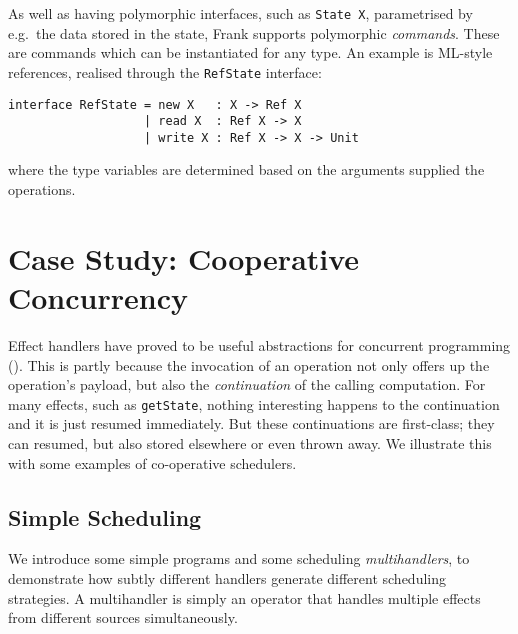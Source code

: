 \documentclass[msc,deptreport,cs]{infthesis} %
\newcommand{\code}[1]{\lstinline{#1}}
\newcommand{\todo}[1]
           {{\par\noindent\small\color{RoyalPurple}
  \framebox{\parbox{\dimexpr\linewidth-2\fboxsep-2\fboxrule}
    {\textbf{TODO:} #1}}}}
\begin{document}
As well as having polymorphic interfaces, such as \code{State X}, parametrised
by e.g.~the data stored in the state, Frank supports polymorphic
\emph{commands}. These are commands which can be instantiated for any type. An
example is ML-style references, realised through the \code{RefState} interface:

\begin{lstlisting}
interface RefState = new X   : X -> Ref X
                   | read X  : Ref X -> X
                   | write X : Ref X -> X -> Unit
\end{lstlisting}

\noindent where the type variables are determined based on the arguments supplied
the operations.

\section{Case Study: Cooperative Concurrency}
\label{sec:concurrency}


Effect handlers have proved to be useful abstractions for concurrent programming
(\cite{dolan2015effective, dolan2017concurrent, hillerstrom2016compilation}).
This is partly because the invocation of an operation not only offers up the
operation's payload, but also the \emph{continuation} of the calling
computation. For many effects, such as \code{getState}, nothing interesting
happens to the continuation and it is just resumed immediately. But these
continuations are first-class; they can resumed, but also stored elsewhere or
even thrown away. We illustrate this with some examples of co-operative schedulers.


%

\subsection{Simple Scheduling}
\label{subsec:simple-scheduling}

We introduce some simple programs and some scheduling \emph{multihandlers}, to
demonstrate how subtly different handlers generate different scheduling
strategies. A multihandler is simply an operator that handles multiple effects from different sources simultaneously.
\end{document}
